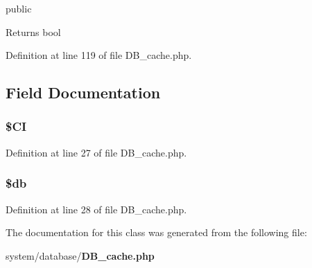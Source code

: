public \begin{DoxyReturn}{Returns}
bool 
\end{DoxyReturn}


Definition at line 119 of file D\-B\-\_\-cache.\-php.



\subsection{Field Documentation}
\subsubsection[{\$\-C\-I}]{\setlength{\rightskip}{0pt plus 5cm}\$C\-I}\label{class_c_i___d_b___cache_ae0314d046ddf7fcfaec03222977427d3}


Definition at line 27 of file D\-B\-\_\-cache.\-php.

\subsubsection[{\$db}]{\setlength{\rightskip}{0pt plus 5cm}\$db}\label{class_c_i___d_b___cache_a1fa3127fc82f96b1436d871ef02be319}


Definition at line 28 of file D\-B\-\_\-cache.\-php.



The documentation for this class was generated from the following file\-:\begin{DoxyCompactItemize}
\item 
system/database/{\bf D\-B\-\_\-cache.\-php}\end{DoxyCompactItemize}

